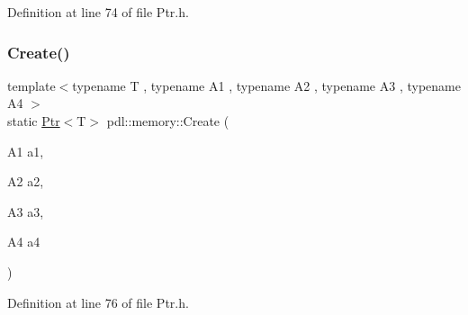 Definition at line 74 of file Ptr.\+h.


\begin{DoxyCode}{0}

\end{DoxyCode}
\mbox{\label{namespacepdl_1_1memory_a2db861a7467f4ab439102fa1d132a643}} 
\subsubsection{\texorpdfstring{Create()}{Create()}\hspace{0.1cm}{\footnotesize\ttfamily [5/8]}}
{\footnotesize\ttfamily template$<$typename T , typename A1 , typename A2 , typename A3 , typename A4 $>$ \\
static \mbox{\hyperlink{classpdl_1_1memory_1_1_ptr}{Ptr}}$<$T$>$ pdl\+::memory\+::\+Create (\begin{DoxyParamCaption}\item[{A1}]{a1,  }\item[{A2}]{a2,  }\item[{A3}]{a3,  }\item[{A4}]{a4 }\end{DoxyParamCaption})\hspace{0.3cm}{\ttfamily [static]}}



Definition at line 76 of file Ptr.\+h.


\begin{DoxyCode}{0}

\end{DoxyCode}
\mbox{\label{namespacepdl_1_1memory_a94912381d1638dd59eb04d616c6b1f9d}} 
